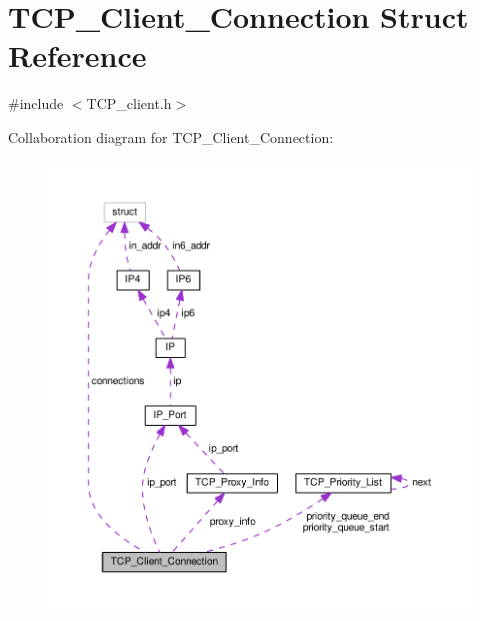 \hypertarget{struct_t_c_p___client___connection}{\section{T\+C\+P\+\_\+\+Client\+\_\+\+Connection Struct Reference}
\label{struct_t_c_p___client___connection}
}


{\ttfamily \#include $<$T\+C\+P\+\_\+client.\+h$>$}



Collaboration diagram for T\+C\+P\+\_\+\+Client\+\_\+\+Connection\+:
\nopagebreak
\begin{figure}[H]
\begin{center}
\leavevmode
\includegraphics[width=350pt]{d7/df2/struct_t_c_p___client___connection__coll__graph}
\end{center}
\end{figure}
